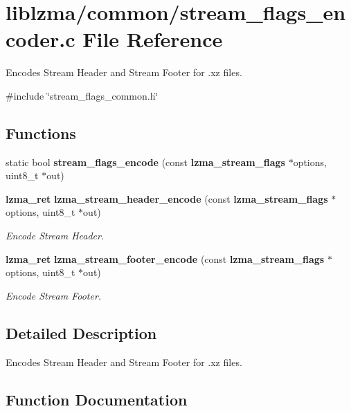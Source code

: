 \section{liblzma/common/stream\+\_\+flags\+\_\+encoder.c File Reference}
\label{stream__flags__encoder_8c}


Encodes Stream Header and Stream Footer for .xz files.  


{\ttfamily \#include \char`\"{}stream\+\_\+flags\+\_\+common.\+h\char`\"{}}\newline
\subsection*{Functions}
\begin{DoxyCompactItemize}
\item 
\mbox{\label{stream__flags__encoder_8c_accd4a19742fc30c8a53f79b4ab6d120a}} 
static bool {\bfseries stream\+\_\+flags\+\_\+encode} (const \textbf{ lzma\+\_\+stream\+\_\+flags} $\ast$options, uint8\+\_\+t $\ast$out)
\item 
\textbf{ lzma\+\_\+ret} \textbf{ lzma\+\_\+stream\+\_\+header\+\_\+encode} (const \textbf{ lzma\+\_\+stream\+\_\+flags} $\ast$options, uint8\+\_\+t $\ast$out)
\begin{DoxyCompactList}\small\item\em Encode Stream Header. \end{DoxyCompactList}\item 
\textbf{ lzma\+\_\+ret} \textbf{ lzma\+\_\+stream\+\_\+footer\+\_\+encode} (const \textbf{ lzma\+\_\+stream\+\_\+flags} $\ast$options, uint8\+\_\+t $\ast$out)
\begin{DoxyCompactList}\small\item\em Encode Stream Footer. \end{DoxyCompactList}\end{DoxyCompactItemize}


\subsection{Detailed Description}
Encodes Stream Header and Stream Footer for .xz files. 



\subsection{Function Documentation}
\mbox{\label{stream__flags__encoder_8c_abb4d5dc555c6d5588aabfe31a6788c92}} 
